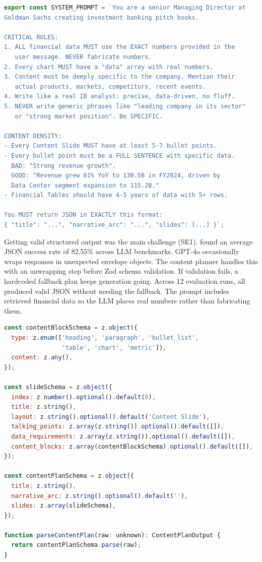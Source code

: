 \vspace{0.5em}\filbreak
\begin{lstlisting}[language=JavaScript, caption=Content planner system prompt excerpt (from pitchbook-content.prompt.ts), label=lst:system-prompt]
export const SYSTEM_PROMPT = `You are a senior Managing Director at
Goldman Sachs creating investment banking pitch books.

CRITICAL RULES:
1. ALL financial data MUST use the EXACT numbers provided in the
   user message. NEVER fabricate numbers.
2. Every chart MUST have a "data" array with real numbers.
3. Content must be deeply specific to the company. Mention their
   actual products, markets, competitors, recent events.
4. Write like a real IB analyst: precise, data-driven, no fluff.
5. NEVER write generic phrases like "leading company in its sector"
   or "strong market position". Be SPECIFIC.

CONTENT DENSITY:
- Every Content Slide MUST have at least 5-7 bullet points.
- Every bullet point must be a FULL SENTENCE with specific data.
  BAD: "Strong revenue growth".
  GOOD: "Revenue grew 61% YoY to 130.5B in FY2024, driven by
  Data Center segment expansion to 115.2B."
- Financial Tables should have 4-5 years of data with 5+ rows.

You MUST return JSON in EXACTLY this format:
{ "title": "...", "narrative_arc": "...", "slides": [...] }`;
\end{lstlisting}

Getting valid structured output was the main challenge (SE1). \textcite{shorten2024} found an average JSON success rate of 82.55\% across LLM benchmarks. GPT-4o occasionally wraps responses in unexpected envelope objects. The content planner handles this with an unwrapping step before Zod \parencite{zod2024} schema validation. If validation fails, a hardcoded fallback plan keeps generation going. Across 12 evaluation runs, all produced valid JSON without needing the fallback. The prompt includes retrieved financial data so the LLM places real numbers rather than fabricating them.

\vspace{0.5em}\filbreak
\begin{lstlisting}[language=JavaScript, caption=Content plan validation with Zod (from pitchbook-content.schema.ts)]
const contentBlockSchema = z.object({
  type: z.enum(['heading', 'paragraph', 'bullet_list',
                'table', 'chart', 'metric']),
  content: z.any(),
});

const slideSchema = z.object({
  index: z.number().optional().default(0),
  title: z.string(),
  layout: z.string().optional().default('Content Slide'),
  talking_points: z.array(z.string()).optional().default([]),
  data_requirements: z.array(z.string()).optional().default([]),
  content_blocks: z.array(contentBlockSchema).optional().default([]),
});

const contentPlanSchema = z.object({
  title: z.string(),
  narrative_arc: z.string().optional().default(''),
  slides: z.array(slideSchema),
});

function parseContentPlan(raw: unknown): ContentPlanOutput {
  return contentPlanSchema.parse(raw);
}
\end{lstlisting}

